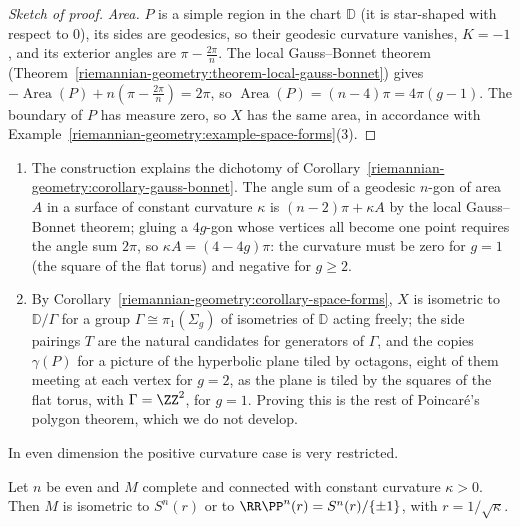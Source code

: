 \begin{proof}[Sketch of proof]
\emph{Area.} $P$ is a simple region in the chart $\mathbb{D}$ (it is star-shaped with respect to $0$), its sides are geodesics, so their geodesic curvature vanishes, $K = -1$, and its exterior angles are
$\pi - \frac{2\pi}{n}$. The local Gauss--Bonnet theorem (Theorem~\ref{riemannian-geometry:theorem-local-gauss-bonnet}) gives $-\operatorname{Area}(P) + n(\pi - \frac{2\pi}{n}) = 2\pi$, so
$\operatorname{Area}(P) = (n - 4)\pi = 4\pi(g - 1)$. The boundary of $P$ has measure zero, so $X$ has the same area, in accordance with Example~\ref{riemannian-geometry:example-space-forms}(3).
\end{proof}

\begin{remark}\label{riemannian-geometry:remark-hyperbolic-surfaces}
\begin{enumerate}
\item The construction explains the dichotomy of Corollary~\ref{riemannian-geometry:corollary-gauss-bonnet}. The angle sum of a geodesic $n$-gon of area $A$ in a surface of constant curvature $\kappa$ is
$(n - 2)\pi + \kappa A$ by the local Gauss--Bonnet theorem; gluing a $4g$-gon whose vertices all become one point requires the angle sum $2\pi$, so $\kappa A = (4 - 4g)\pi$: the curvature must be zero for $g = 1$
(the square of the flat torus) and negative for $g \geq 2$.
\item By Corollary~\ref{riemannian-geometry:corollary-space-forms}, $X$ is isometric to $\mathbb{D}/\Gamma$ for a group $\Gamma \cong \pi_1(\Sigma_g)$ of isometries of $\mathbb{D}$ acting freely;
the side pairings $T$ are the natural candidates for generators of $\Gamma$, and the copies $\gamma(P)$ for a picture of the hyperbolic plane tiled by octagons, eight of them meeting at each vertex
for $g = 2$, as the plane is tiled by the squares of the flat torus, with $\Gamma = \ZZ^2$, for $g = 1$. Proving this is the rest of Poincar\'e's polygon theorem, which we do not develop.
\end{enumerate}
\end{remark}

In even dimension the positive curvature case is very restricted.

\begin{corollary}\label{riemannian-geometry:corollary-even-spherical}
Let $n$ be even and $M$ complete and connected with constant curvature $\kappa > 0$. Then $M$ is isometric to $S^n(r)$ or to $\RR\PP^n(r) = S^n(r)/\{\pm1\}$, with
$r = 1/\sqrt\kappa$.
\end{corollary}

